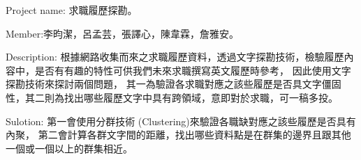 \documentclass{article}
\begin{document}
Project name: 求職履歷探勘。

Member:李昀潔，呂孟芸，張譯心，陳韋霖，詹雅安。

Description: 
根據網路收集而來之求職履歷資料，透過文字探勘技術，檢驗履歷內容中，是否有有趣的特性可供我們未來求職撰寫英文履歷時參考，
因此使用文字探勘技術來探討兩個問題，
其一為驗證各求職對應之該些履歷是否具文字僵固性，其二則為找出哪些履歷文字中具有跨領域，意即對於求職，可一稿多投。

Sulotion:
第一會使用分群技術 (Clustering)來驗證各職缺對應之該些履歷是否具有內聚，
第二會計算各群文字間的距離，找出哪些資料點是在群集的邊界且跟其他一個或一個以上的群集相近。
\end{document}
